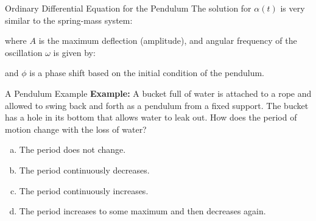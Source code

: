 \documentclass[12pt,compress,aspectratio=169]{beamer}
\newcommand{\eq}[2]{\vspace{#1}{\Large\begin{displaymath}#2\end{displaymath}}}
\begin{document}
\begin{frame}{Ordinary Differential Equation for the Pendulum}
  The solution for $\alpha(t)$ is very similar to the spring-mass system:

    \eq{-.2in}{
      \boxed{\alpha(t)=A\cos(\omega t-\phi)}
    }

    where $A$ is the maximum deflection (amplitude), and angular frequency of
    the oscillation $\omega$ is given by:
    
    \eq{-.15in}{
      \boxed{\omega=\sqrt{\frac{g}{L}}}
    }

    and $\phi$ is a phase shift based on the initial condition of the pendulum.
\end{frame}






\begin{frame}{A Pendulum Example}
  \textbf{Example:} A bucket full of water is attached to a rope and allowed
  to swing back and forth as a pendulum from a fixed support. The bucket has a
  hole in its bottom that allows water to leak out. How does the period of
  motion change with the loss of water?
  \begin{enumerate}[(a)]
  \item The period does not change.
  \item The period continuously decreases.
  \item The period continuously increases.
  \item The period increases to some maximum and then decreases again.
  \end{enumerate}
\end{frame}
\end{document}
